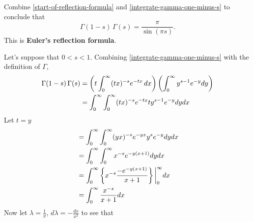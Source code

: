 \documentclass{homework}
\begin{document}
                                                    \begin{problem}\label{euler-reflection-formula}Combine \ref{start-of-reflection-formula} and \ref{integrate-gamma-one-minus-s} to conclude that
                                                      \[
                                                          \Gamma(1-s) \, \Gamma(s) = \frac{\pi}{\sin \left( \pi s \right)}.
                                                            \]
                                                              This is \textbf{Euler's reflection formula}.
                                                              \end{problem}
                                                              \begin{solution}
                                                              Let's suppose that $0<s<1$.
                                                              Combining \ref{integrate-gamma-one-minus-s} with the definition of $\Gamma$,
                                                              \begin{align*}
                                                              \Gamma(1-s) \, \Gamma(s) &= \left(t\int_0^\infty (tx)^{-s} e^{-tx}\, dx\right)\left(\int_0^\infty y^{s-1}e^{-y} dy\right)\\
                                                              &= \int_0^\infty \int_0^\infty (tx)^{-s} e^{-tx} ty^{s-1}e^{-y} dy dx
                                                              \end{align*}
                                                              Let $t=y$
                                                              \begin{align*}
                                                              &= \int_0^\infty \int_0^\infty (yx)^{-s} e^{-yx} y^{s}e^{-y} dy dx\\
                                                              &= \int_0^\infty \int_0^\infty x^{-s} e^{-y(x+1)} dy dx\\
                                                              &= \int_0^\infty \left\{x^{-s} \frac{-e^{-y(x+1)}}{x+1}\right\}\bigg|_0^\infty dx\\
                                                              &= \int_0^\infty \frac{x^{-s}}{x+1} dx
                                                              \end{align*}
                                                              Now let $\lambda = \frac{1}{x}$, $d\lambda = -\frac{dx}{x^2}$ to see that 

\end{solution}
\end{document}
